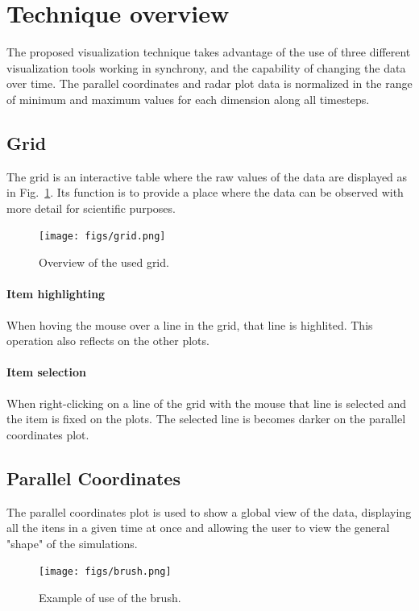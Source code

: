\documentclass[10pt, conference]{IEEEtran}
\begin{document}
\section{Technique overview}
%

The proposed visualization technique takes advantage of the use of three different visualization tools working in synchrony, and the capability of changing the data over time. The parallel coordinates and radar plot data is normalized in the range of minimum and maximum values for each dimension along all timesteps.

\subsection{Grid}

The grid is an interactive table where the raw values of the data are displayed as in Fig.~\ref{fig:grid}. Its function is to provide a place where the data can be observed with more detail for scientific purposes.

\begin{figure}
\texttt{[image: figs/grid.png]}
\caption{Overview of the used grid.} 
\label{fig:grid}
\end{figure}
\paragraph*{Item highlighting} When hoving the mouse over a line in the grid, that line is highlited. This operation also reflects on the other plots.
\paragraph*{Item selection} When right-clicking on a line of the grid with the mouse that line is selected and the item is fixed on the plots. The selected line is becomes darker on the parallel coordinates plot.

\subsection{Parallel Coordinates}

The parallel coordinates plot is used to show a global view of the data, displaying all the itens in a given time at once and allowing the user to view the general "shape" of the simulations.

\begin{figure}
\texttt{[image: figs/brush.png]}
\caption{Example of use of the brush.} 
\label{fig:brush}
\end{figure}
\end{document}

